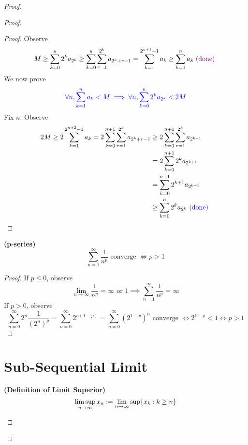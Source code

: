 \documentclass{report}
\begin{document}
\begin{proof}
\begin{proof}
\begin{proof}
Observe
\begin{equation}
M\geq \sum_{k=0}^u 2^k a_{2^k}\geq \sum_{k=0}^u \sum_{r=1}^{2^k} a_{2^{k}+r-1}=\sum_{k=1}^{2^{u+1}-1} a_k\geq \sum_{k=1}^n a_k\textcolor{violet}{\text{ (done) }}
\end{equation}
We now prove
\begin{equation}
  \textcolor{blue}{\forall n,\sum_{k=1}^n a_k<M\implies \forall n, \sum_{k=0}^n 2^ka_{2^k}<2M}
\end{equation}
Fix $n$. Observe
\begin{align}
  2M\geq 2\sum_{k=1}^{2^{n+2}-1} a_k=2\sum_{k=0}^{n+1}\sum_{r=1}^{2^k}a_{2^k+r-1}&\geq 2\sum_{k=0}^{n+1} \sum_{r=1}^{2^k}a_{2^{k+1}}\\
  &=2\sum_{k=0}^{n+1} 2^ka_{2^{k+1}}\\
  &=\sum_{k=0}^{n+1} 2^{k+1}a_{2^{k+1}}\\
  &\geq \sum_{k=0}^n 2^{k}a_{2^k}\textcolor{blue}{\text{ (done) }}
\end{align}
\end{proof}
\begin{corollary}
\label{4.3.12}
\textbf{(p-series)}
\begin{equation}
\sum_{n=1}^\infty \frac{1}{n^p}\text{ converge }\iff  p>1
\end{equation}
\end{corollary}
\begin{proof}
If $p\leq 0$, observe
\begin{equation}
\lim_{n\to\infty}\frac{1}{n^p}=\infty\text{ or }1\implies \sum_{n=1}^\infty \frac{1}{n^p}=\infty
\end{equation}
If $p>0$, observe
 \begin{equation}
\sum_{n=0}^\infty 2^n \frac{1}{(2^n)^p}=\sum_{n=0}^\infty 2^{n(1-p)}=\sum_{n=0}^\infty (2^{1-p})^n\text{ converge }\iff 2^{1-p}<1\iff p>1
\end{equation}
\end{proof}

\section{Sub-Sequential Limit}
\begin{definition}
\label{4.4.1}
\textbf{(Definition of Limit Superior)} 
\begin{equation*}
\limsup_{n\to\infty} x_n:= \lim_{n\to\infty} \sup \{ x_k:k\geq n \}
\end{equation*}
\end{definition}
\end{proof}
\end{proof}
\end{document}
